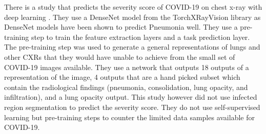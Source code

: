 There is a study that predicts the severity score of COVID-19 on chest x-ray with deep learning \cite{ref28}. They use a DenseNet model from the TorchXRayVision library as DenseNet models have been shown to predict Pneumonia well. They use a pre-training step to train the feature extraction layers and a task prediction layer. The pre-training step was used to generate a general representations of lungs and other CXRs that they would have unable to achieve from the small set of COVID-19 images available. They use a network that outputs 18 outputs of a representation of the image, 4 outputs that are a hand picked subset which contain the radiological findings (pneumonia, consolidation, lung opacity, and infiltration), and a lung opacity output. This study however did not use infected region segmentation to predict the severity score. They do not use self-supervised learning but pre-training steps to counter the limited data samples available for COVID-19.


